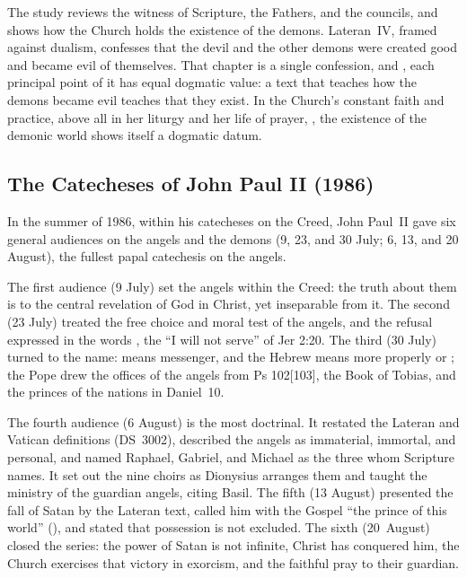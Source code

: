 The study reviews the witness of Scripture, the Fathers, and the councils,
and shows how the Church holds the existence of the demons. Lateran~IV,
framed against dualism, confesses that the devil and the other demons were
created good and became evil of themselves. That chapter is a single
confession, and , each principal point of it has equal dogmatic value: a
text that teaches how the demons became evil teaches that they exist. In
the Church's constant faith and practice, above all in her liturgy and her
life of prayer, , the existence of the demonic world shows itself a dogmatic
datum.

\sectionguard
\subsection{The Catecheses of John Paul II (1986)}

In the summer of 1986, within his catecheses on the Creed, John Paul~II
gave six general audiences on the angels and the demons (9, 23, and 30
July; 6, 13, and 20 August), the fullest papal catechesis on the angels.

The first audience (9 July) set the angels within the Creed: the truth
about them is  to the central revelation of God in
Christ, yet inseparable from it. The second (23 July) treated the free choice and moral test of the
angels, and the refusal expressed in the words ,
the ``I will not serve'' of Jer 2:20. The third (30 July) turned to the
name:  means messenger, and the Hebrew  means
more properly  or ; the Pope drew the offices of the angels
from Ps 102[103], the Book of Tobias, and the princes of the nations in
Daniel~10.

The fourth audience (6 August) is the most doctrinal. It restated the
Lateran and Vatican definitions (DS~3002), described the angels as
immaterial, immortal, and personal, and named Raphael, Gabriel, and Michael
as the three whom Scripture names. It set out the nine choirs as Dionysius
arranges them and taught the ministry of the guardian angels, citing
Basil. The fifth (13 August) presented the fall of Satan by
the Lateran text, called him with the Gospel ``the prince of this world''
(), and stated that possession is not
excluded. The sixth (20~August) closed the series: the power of Satan is
not infinite, Christ has conquered him, the Church exercises that victory
in exorcism, and the faithful pray  to their guardian.

